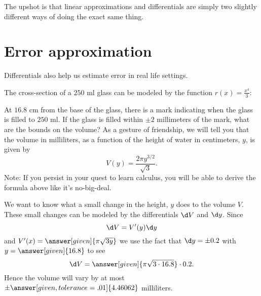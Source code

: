 \documentclass{ximera}
\begin{document}
The upshot is that linear approximations and differentials are simply
two slightly different ways of doing the exact same thing.

\section{Error approximation}

Differentials also help us estimate error in real life settings.

\begin{example}
  The cross-section of a $250$ ml glass can be modeled by the function
  $r(x) = \frac{x^4}{3}$:
  \begin{image}
  \end{image}
  At $16.8$ cm from the base of the glass, there is a mark indicating
  when the glass is filled to $250$ ml. If the glass is filled within
  $\pm 2$ millimeters of the mark, what are the bounds on the volume?
  As a gesture of friendship, we will tell you that the volume in
  milliliters, as a function of the height of water in centimeters, $y$,
  is given by
  \[
  V(y) = \frac{2\pi y^{3/2}}{\sqrt{3}}.
  \]
  Note: If you persist in your quest to learn calculus, you will be
  able to derive the formula above like it's no-big-deal.
  \begin{explanation}
    We want to know what a small change in the height, $y$ does to the
    volume $V$.  These small changes can be modeled by the
    differentials $\d V$ and $\d y$. Since
    \[
    \d V = V'(y) \d y
    \]
    and $V'(x) = \answer[given]{\pi \sqrt{3 y}}$ we use the fact that
    $\d y = \pm 0.2$ with $y=\answer[given]{16.8}$ to see
    \[
    \d V = \answer[given]{\pi \sqrt{3 \cdot 16.8}} \cdot 0.2.
    \]
    Hence the volume will vary by at most $\pm\answer[given,tolerance=.01]{4.46062}$
    milliliters.
  \end{explanation}
\end{example}
\end{document}
